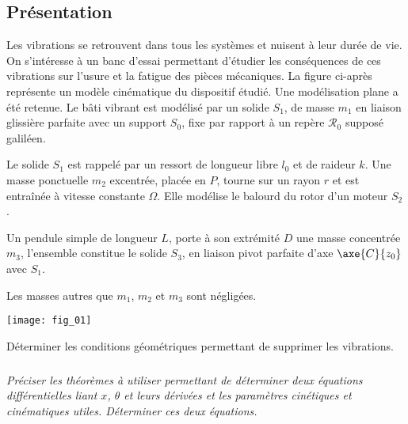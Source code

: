\def\columnseprulecolor{\color{ocre}}
\setlength{\columnseprule}{0.4pt} 


\setcounter{exo}{0}



\ifprof
\else
\begin{multicols}{2}


\subsection*{Présentation}
Les vibrations se retrouvent dans tous les systèmes et nuisent à leur durée de vie. On s’intéresse à un banc d’essai permettant d’étudier les conséquences de ces vibrations sur l’usure et la fatigue des pièces mécaniques.
La figure ci-après représente un modèle cinématique du dispositif étudié. Une modélisation plane a été retenue.
Le bâti vibrant est modélisé par un solide $S_1$, de masse $m_1$ en liaison glissière parfaite avec un support $S_0$, fixe par rapport à un repère $\mathcal{R}_0$ supposé galiléen.

Le solide $S_1$ est rappelé par un ressort de longueur libre $l_0$ et de raideur $k$.
Une masse ponctuelle $m_2$ excentrée, placée en $P$, tourne sur un rayon $r$ et est entraînée à vitesse constante $\Omega$. Elle modélise le 
balourd du rotor d’un moteur $S_2$.

Un pendule simple de longueur $L$, porte à son extrémité $D$ une masse concentrée $m_3$, l’ensemble constitue le solide $S_3$, en liaison pivot parfaite d’axe $\axe{C}{z_0}$ avec $S_1$.

Les masses autres que $m_1$, $m_2$ et $m_3$ sont négligées.



\begin{center}
\texttt{[image: fig\_01]}
\end{center}

\begin{obj}
Déterminer les conditions géométriques permettant de supprimer les vibrations.
\end{obj}


\subparagraph{}
\textit{Préciser les théorèmes à utiliser permettant de déterminer deux équations différentielles liant $x$, $\theta$ et leurs dérivées et les paramètres cinétiques et cinématiques utiles. Déterminer ces deux équations.}
\ifprof
\begin{corrige}
\end{corrige}
\else
\fi


\end{multicols}
